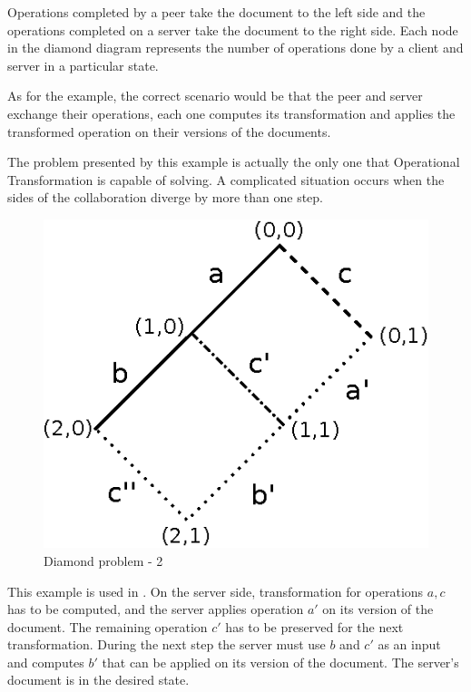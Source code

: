 \documentclass[12pt,oneside]{fithesis2}
\begin{document}
Operations completed by a peer take the document to the left side and the operations completed on a server take the document to the right side. Each node in the diamond diagram represents the number of operations done by a client and server in a particular state. 
\par As for the example, the correct scenario would be that the peer and server exchange their operations, each one computes its transformation and applies the transformed operation on their versions of the documents.
\par The problem presented by this example is actually the only one that Operational Transformation is capable of solving. A complicated situation occurs when the sides of the collaboration diverge by more than one step. 
\begin{figure}[H]
\caption{Diamond problem - 2}
\label{fig:diamond2}
\centering
\vspace{5mm}
\includegraphics{diamond2}
\end{figure}
This example is used in \cite{Spiewak}. On the server side, transformation for operations \(a,c\) has to be computed, and the server applies operation \(a'\) on its version of the document. The remaining operation \(c'\) has to be preserved for the next transformation. During the next step the server must use \(b\) and \(c'\) as an input and computes \(b'\) that can be applied on its version of the document. The server's document is in the desired state. 
\end{document}
